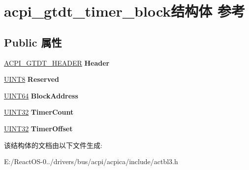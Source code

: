 \hypertarget{structacpi__gtdt__timer__block}{}\section{acpi\+\_\+gtdt\+\_\+timer\+\_\+block结构体 参考}
\label{structacpi__gtdt__timer__block}
\subsection*{Public 属性}
\begin{DoxyCompactItemize}
\item 
\mbox{\label{structacpi__gtdt__timer__block_a4e76289a0d0259e303075e9dfda9b7c8}} 
\hyperlink{structacpi__gtdt__header}{A\+C\+P\+I\+\_\+\+G\+T\+D\+T\+\_\+\+H\+E\+A\+D\+ER} {\bfseries Header}
\item 
\mbox{\label{structacpi__gtdt__timer__block_a8ed2d3a45cefc7bfb20732b46ba74669}} 
\hyperlink{_processor_bind_8h_ab27e9918b538ce9d8ca692479b375b6a}{U\+I\+N\+T8} {\bfseries Reserved}
\item 
\mbox{\label{structacpi__gtdt__timer__block_ac6c18e6500605e2f7fdecb7c86599fa0}} 
\hyperlink{_processor_bind_8h_a57be03562867144161c1bfee95ca8f7c}{U\+I\+N\+T64} {\bfseries Block\+Address}
\item 
\mbox{\label{structacpi__gtdt__timer__block_a2e07db68ed1a5e73b0d74909aca5558b}} 
\hyperlink{_processor_bind_8h_ae1e6edbbc26d6fbc71a90190d0266018}{U\+I\+N\+T32} {\bfseries Timer\+Count}
\item 
\mbox{\label{structacpi__gtdt__timer__block_ad62ff77eb96a37eddd5f2c1ea14d723c}} 
\hyperlink{_processor_bind_8h_ae1e6edbbc26d6fbc71a90190d0266018}{U\+I\+N\+T32} {\bfseries Timer\+Offset}
\end{DoxyCompactItemize}


该结构体的文档由以下文件生成\+:\begin{DoxyCompactItemize}
\item 
E\+:/\+React\+O\+S-\/0../drivers/bus/acpi/acpica/include/actbl3.\+h\end{DoxyCompactItemize}
